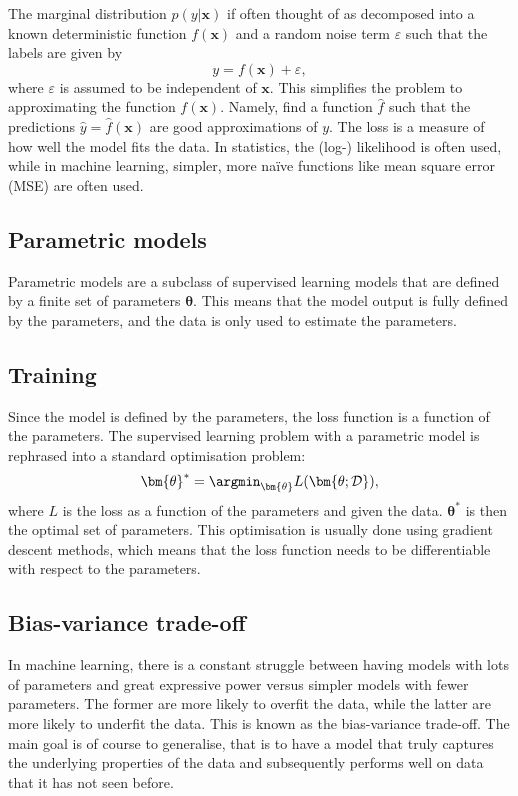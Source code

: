 The marginal distribution $p(y|\bm{x})$ if often thought of as decomposed into a known deterministic function $f(\bm{x})$ and a random noise term $\varepsilon$ such that the labels are given by
\begin{equation}
    y = f(\bm{x}) + \varepsilon,
    \label{eq:ml_model}
\end{equation}
where $\varepsilon$ is assumed to be independent of $\bm{x}$.
This simplifies the problem to approximating the function $f(\bm{x})$.
Namely, find a function $\hat{f}$ such that the predictions $\hat{y}=\hat{f}(\bm{x})$ are good approximations of $y$.
The loss is a measure of how well the model fits the data.
In statistics, the (log-) likelihood is often used, while in machine learning, simpler, more naïve functions like mean square error (MSE) are often used.


\subsection{Parametric models}
Parametric models are a subclass of supervised learning models that are defined by a finite set of parameters $\bm{\theta}$.
This means that the model output is fully defined by the parameters, and the data is only used to estimate the parameters.

\subsection{Training}
Since the model is defined by the parameters, the loss function is a function of the parameters.
The supervised learning problem with a parametric model is rephrased into a standard optimisation problem:
\begin{equation}
    \bm{\theta}^* = \argmin_{\bm{\theta}} L(\bm{\theta; \mathcal{D}}),
\end{equation}
where $L$ is the loss as a function of the parameters and given the data.
$\bm{\theta}^*$ is then the optimal set of parameters.
This optimisation is usually done using gradient descent methods, which means that the loss function needs to be differentiable with respect to the parameters.


\subsection{Bias-variance trade-off}
In machine learning, there is a constant struggle between having models with lots of parameters and great expressive power versus simpler models with fewer parameters.
The former are more likely to overfit the data, while the latter are more likely to underfit the data.
This is known as the bias-variance trade-off.
The main goal is of course to generalise, that is to have a model that truly captures the underlying properties of the data and subsequently performs well on data that it has not seen before.

